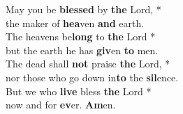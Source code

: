 May you be \textbf{blessed} by \textbf{the} Lord, *\\
the maker of \textbf{hea}ven \textbf{and} earth.\\
The heavens be\textbf{long} to \textbf{the} Lord *\\
but the earth he has \textbf{giv}en \textbf{to} men.\\

The dead shall \textbf{not} praise \textbf{the} Lord, *\\
nor those who go down in\textbf{to} the \textbf{sil}ence.\\
But we who \textbf{live} bless \textbf{the} Lord *\\
now and for \textbf{ev}er. \textbf{Am}en.

